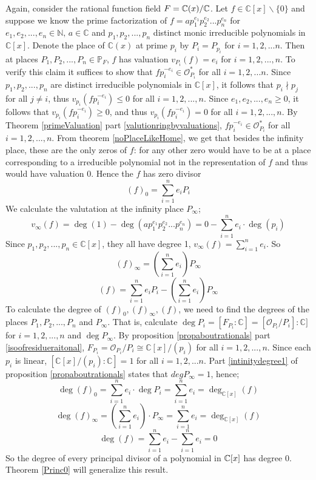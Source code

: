 \begin{example} 
	Again, consider the rational function field $ F = \mathbb{C}(x)/\mathbb{C} $. 
	Let $f \in \mathbb{C}[x] \backslash \lbrace 0 \rbrace  $ 
	and suppose we know the prime factorization of
	$f = a p_1^{e_1}p_2^{e_2}...p_n^{e_n}$ for
	$e_1,e_2,...,e_n \in \mathbb{N} \text{, } a\in \mathbb{C}$ and $p_1,p_2,...,p_n$ 
	distinct monic irreducible polynomials in
	$\mathbb{C}[x]$. Denote the place of $\mathbb{C}(x)$ at prime
	$p_i$ by $P_i = P_{p_i}$ for $i = 1,2,...n$. Then at places
	$P_1,P_2,...,P_n \in \mathbb{P}_F$, $f$ has
	valuation $v_{P_i}(f) = e_i $ for $i=1,2,...,n$. To verify 
	this claim it suffices
	to show that $fp_i^{-e_i} \in \mathcal{O}_{P_i}^*$ for 
	all $i = 1,2,...n$. Since $p_1,p_2,...,p_n$ are distinct
	irreducible polynomials in $\mathbb{C}[x]$, it follows that
	$p_i \nmid p_j $ for all $j \neq i$, thus
	$v_{p_i}(fp_i^{-e_{i}}) \leq 0$ for all $i = 1,2,...,n$.
	Since $e_1,e_2,...,e_n \geq 0$, it follows that
	$v_{p_i}(fp_i^{-e_{i}}) \geq 0$, and thus
	$v_{p_i}(fp_i^{-e_{i}}) = 0$ for all $i=1,2,...,n$. 
	By Theorem \ref{primeValuation} part \ref{valutionringbyvaluations},
	$fp_i^{-e_i} \in \mathcal{O}_{P_i}^*$ 
	for all $i=1,2,...,n$. From theorem \ref{noPlaceLikeHome}, 
	we get that besides the infinity place, 
	these are the only zeros of $f$: for any other 
	zero would have to be at a place corresponding to a 
	irreducible polynomial not in the representation of $f$ 
	and thus would have valuation $0$. Hence the $f$ has zero 
	divisor $$ (f)_0 = \sum^n_{i=1} e_i P_i $$ We calculate 
	the valutation at the infinity place $P_{\infty}$;
	$$ v_{\infty}(f) = \deg (1) - \deg(a p_1^{e_1}p_2^{e_2}...p_n^{e_n}) = 0 - \sum^n_{i=1} e_i \cdot \deg(p_i)$$ 
	Since $p_1,p_2,...,p_n \in \mathbb{C}[x]$, 
	they all have degree 1,  $v_{\infty}(f) = \sum^n_{i =1 } e_i$. 
	So
	$$ (f)_{\infty} = (\sum^n_{i=1} e_i )P_{\infty}$$
	$$(f)= \sum^n_{i=1} e_i P_i -   (\sum^n_{i=1} e_i) P_{\infty} $$ 
	To calculate the degree of $(f)_0,(f)_{\infty},(f)$, we need to find the
	degrees of the places $P_1,P_2,...,P_n$ and $P_{\infty}$. That is,
	calculate $\deg P_i = [F_{P_i} : \mathbb{C}] = [\mathcal{O}_{P_i}/ P_i] : \mathbb{C}]$ 
	for $i = 1,2,...,n $ and $\deg P_{\infty}$. 
	By proposition \ref{propaboutrationals} part \eqref{isoofresidueraitonal},
	$F_{P_i} = \mathcal{O} _ {P_i} / P_i \cong \mathbb{C}[x]/(p_i) $ for all
	$i = 1,2,...,n$. Since each $p_i$ is linear,
	$[\mathbb{C}[x]/(p_i) : \mathbb{C}] = 1$ for all
	$i = 1,2,...n $. Part \eqref{intinitydegree1} of proposition
	\ref{propaboutrationals} states
	that $degP_{\infty} = 1$, hence;
	$$\deg (f)_0 = \sum^n_{i=1} e_ i \cdot \deg P_i =  
	\sum^n_{i=1} e_i = \deg _{\mathbb{C}[x]}(f)$$
	$$\deg (f)_{\infty} = (\sum^n_{i=1} e_i ) \cdot P_{\infty} = 
	\sum^n_{i=1} e_i = \deg _{\mathbb{C}[x]}(f) $$
	$$ \deg (f) =  \sum^n_{i=1} e_i - \sum^n_{i=1} e_i  = 0$$
	So the degree of every principal divisor of a polynomial in $\mathbb{C}[x]$ has
	degree 0. Theorem \ref{Princ0} will generalize this result.
\end{example} 

